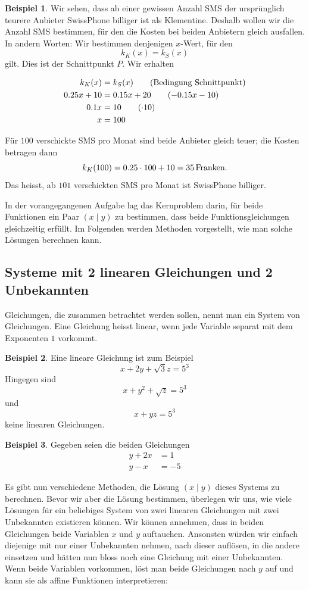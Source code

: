 \documentclass[%
11pt,%
twoside,%
titlepage,%
swissgerman,%
headsepline%
]{scrartcl}
\theoremstyle{definition}
\newtheorem{bsp}{Beispiel}[subsection] %
\theoremstyle{plain}
\begin{document}
\begin{bsp}
		Wir sehen, dass ab einer gewissen Anzahl SMS der ursprünglich teurere Anbieter SwissPhone billiger ist als Klementine. Deshalb wollen wir die Anzahl SMS bestimmen, für den die Kosten bei beiden Anbietern gleich ausfallen. In andern Worten: Wir bestimmen denjenigen $x$-Wert, für den
		$$k_K(x)=k_S(x)$$
		gilt. Dies ist der Schnittpunkt $P$.
		Wir erhalten
		
		\begin{align}
			k_K(x)&=k_S(x)\tag{Bedingung Schnittpunkt}\\
			0.25x+10&=0.15x+20\tag{$-0.15x-10$}\\
			0.1x&=10\tag{$\cdot10$}\\
			x&=100\notag
		\end{align}
		
		Für $100$ verschickte SMS pro Monat sind beide Anbieter gleich teuer; die Kosten betragen dann
		$$k_K(100)=0.25\cdot100+10=\unit[35]{Franken}.$$
		Das heisst, ab $101$ verschickten SMS pro Monat ist SwissPhone billiger.
	\end{bsp}
	
	In der vorangegangenen Aufgabe lag das Kernproblem darin, für beide Funktionen ein Paar $(x\mid y)$ zu bestimmen, dass beide Funktionsgleichungen gleichzeitig erfüllt. Im Folgenden werden Methoden vorgestellt, wie man solche Lösungen berechnen kann.
	
	\subsection{Systeme mit 2 linearen Gleichungen und 2 Unbekannten}
	
	Gleichungen, die zusammen betrachtet werden sollen, nennt man ein System von Gleichungen. Eine Gleichung heisst linear, wenn jede Variable separat mit dem Exponenten $1$ vorkommt.
	
	\begin{bsp}
		Eine lineare Gleichung ist zum Beispiel
		$$x+2y+\sqrt{3}z=5^3$$
		Hingegen sind
		$$x+y^2+\sqrt{z}=5^3$$
		und
		$$x+yz=5^3$$
		keine linearen Gleichungen.
	\end{bsp}
	
	\begin{bsp}
		Gegeben seien die beiden Gleichungen
		\begin{align}
			y+2x&=1\\
			y-x&=-5
		\end{align}
	\end{bsp}
	
	Es gibt nun verschiedene Methoden, die Lösung $(x\mid y)$ dieses Systems zu berechnen. Bevor wir aber die Lösung bestimmen, überlegen wir uns, wie viele Lösungen für ein beliebiges System von zwei linearen Gleichungen mit zwei Unbekannten existieren können.
	Wir können annehmen, dass in beiden Gleichungen beide Variablen $x$ und $y$ auftauchen. Ansonsten würden wir einfach diejenige mit nur einer Unbekannten nehmen, nach dieser  auflösen, in die andere einsetzen und hätten nun bloss noch eine Gleichung mit einer Unbekannten. Wenn beide Variablen vorkommen, löst man beide Gleichungen nach $y$ auf und kann sie als affine Funktionen interpretieren:
	
\end{document}
